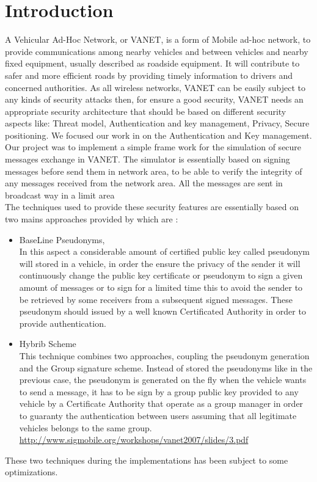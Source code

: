 \section{Introduction}
A Vehicular Ad-Hoc Network, or VANET, is a form of Mobile ad-hoc network, to provide communications among nearby vehicles and between vehicles and nearby fixed equipment, usually described as roadside equipment. It will contribute to safer and more efficient roads by providing timely information to drivers and concerned authorities.
As all wireless networks, VANET can be easily subject to any kinds of security  attacks then, for ensure a good security, VANET needs an appropriate security architecture that should be based on different security aspects like: Threat model, Authentication and key management, Privacy, Secure positioning. We focused our work in on the  Authentication and Key management.\\
Our project was to implement a simple frame work for the simulation of secure messages exchange in VANET. The simulator is essentially based on  signing  messages before send them in network area, to be able to verify the integrity of any messages received from the network area. All the messages are sent in broadcast way in a limit area\\
The techniques used to provide these security features are essentially based on two mains approaches provided
 by\cite{calandriello} which are :
\begin{itemize}
\item BaseLine Pseudonyms,\\
In this aspect a considerable amount of certified public key called pseudonym  will stored in a vehicle, in order the ensure the privacy of the sender it will continuously change the public key certificate or pseudonym to sign a given amount of messages or to sign for a limited time this to avoid the sender to be retrieved by some receivers from a subsequent signed messages. These pseudonym should issued by a well known Certificated Authority in order to provide authentication.

\item Hybrib Scheme\\
This technique combines two approaches, coupling the pseudonym generation and the Group signature scheme.
Instead of stored the pseudonyms like in the previous case, the pseudonym  is generated on the fly when the vehicle wants to send a message, it has to be sign by a group public key provided to any vehicle by a Certificate Authority that operate as a group manager in order to guaranty the authentication between users assuming that all legitimate vehicles belongs to the same group.
\\
\url{http://www.sigmobile.org/workshops/vanet2007/slides/3.pdf}
\end{itemize}
These two techniques during the implementations has been subject to some optimizations.
